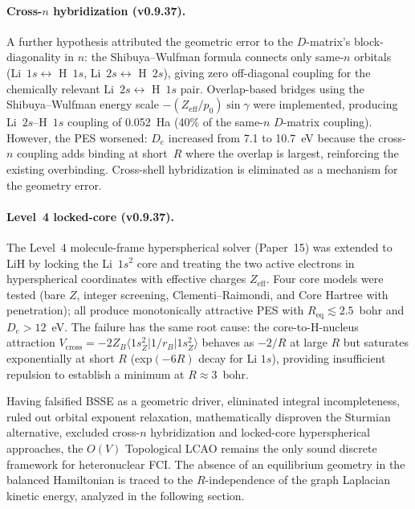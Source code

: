 \documentclass[aps,pra,twocolumn,superscriptaddress,longbibliography]{revtex4-2}
\begin{document}
\paragraph{Cross-$n$ hybridization (v0.9.37).}
A further hypothesis attributed the geometric error to the $D$-matrix's
block-diagonality in $n$: the Shibuya--Wulfman formula connects only
same-$n$ orbitals (Li~$1s \leftrightarrow$ H~$1s$, Li~$2s \leftrightarrow$
H~$2s$), giving zero off-diagonal coupling for the chemically relevant
Li~$2s \leftrightarrow$ H~$1s$ pair.  Overlap-based bridges using the
Shibuya--Wulfman energy scale $-(Z_{\mathrm{eff}}/p_0)\sin\gamma$ were
implemented, producing Li~$2s$--H~$1s$ coupling of 0.052~Ha (40\% of
the same-$n$ $D$-matrix coupling).  However, the PES worsened: $D_e$
increased from 7.1 to 10.7~eV because the cross-$n$ coupling adds
binding at short~$R$ where the overlap is largest, reinforcing the
existing overbinding.  Cross-shell hybridization is eliminated as a
mechanism for the geometry error.

\paragraph{Level~4 locked-core (v0.9.37).}
The Level~4 molecule-frame hyperspherical solver (Paper~15) was extended
to LiH by locking the Li~$1s^2$ core and treating the two active
electrons in hyperspherical coordinates with effective charges
$Z_{\mathrm{eff}}$.  Four core models were tested (bare $Z$, integer
screening, Clementi--Raimondi, and Core Hartree with penetration); all
produce monotonically attractive PES with $R_{\mathrm{eq}} \lesssim
2.5$~bohr and $D_e > 12$~eV.  The failure has the same root cause:
the core-to-H-nucleus attraction $V_{\mathrm{cross}} = -2Z_B\langle
1s^2_Z | 1/r_B | 1s^2_Z \rangle$ behaves as $-2/R$ at large $R$ but
saturates exponentially at short $R$ (exp$(-6R)$ decay for Li $1s$),
providing insufficient repulsion to establish a minimum at
$R \approx 3$~bohr.

\medskip

Having falsified BSSE as a geometric driver, eliminated integral
incompleteness, ruled out orbital exponent relaxation, mathematically
disproven the Sturmian alternative, excluded cross-$n$ hybridization
and locked-core hyperspherical approaches, the $O(V)$
Topological LCAO remains the only sound discrete framework for
heteronuclear FCI.  The absence of an equilibrium geometry in the
balanced Hamiltonian is traced to the $R$-independence of the graph
Laplacian kinetic energy, analyzed in the following section.
\end{document}

